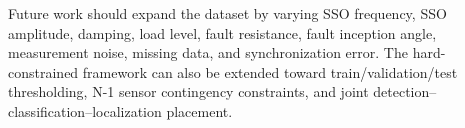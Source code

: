 \documentclass[conference]{IEEEtran}
\begin{document}
Future work should expand the dataset by varying SSO frequency, SSO amplitude, damping, load level, fault resistance, fault inception angle, measurement noise, missing data, and synchronization error. The hard-constrained framework can also be extended toward train/validation/test thresholding, N-1 sensor contingency constraints, and joint detection--classification--localization placement.



\end{document}
